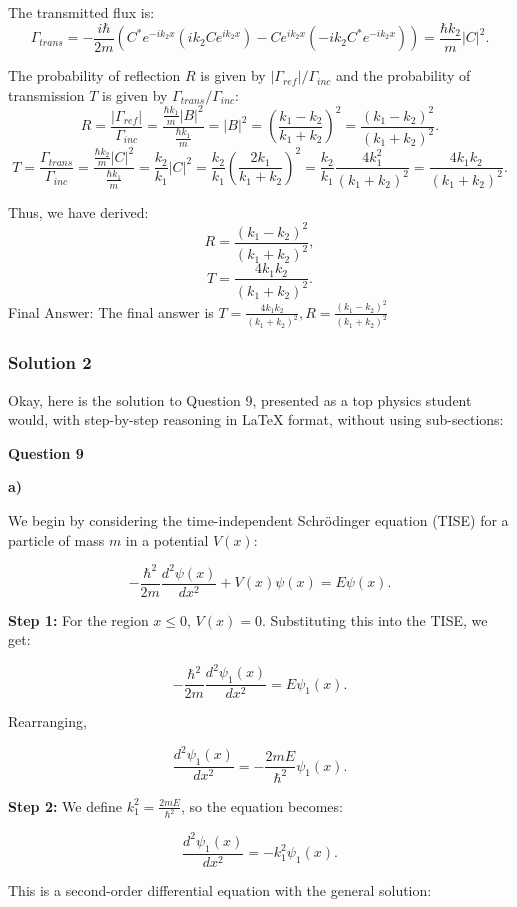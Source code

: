 \documentclass{article}
\begin{document}
The transmitted flux is:
\[
\Gamma_{trans} = -\frac{i\hbar}{2m} \left( C^*e^{-ik_2x}(ik_2Ce^{ik_2x}) - Ce^{ik_2x}(-ik_2C^*e^{-ik_2x}) \right) = \frac{\hbar k_2}{m} |C|^2.
\]

The probability of reflection $R$ is given by $|\Gamma_{ref}| / \Gamma_{inc}$ and the probability of transmission $T$ is given by $\Gamma_{trans} / \Gamma_{inc}$:
\[
R = \frac{|\Gamma_{ref}|}{\Gamma_{inc}} = \frac{\frac{\hbar k_1}{m} |B|^2}{\frac{\hbar k_1}{m}} = |B|^2 = \left( \frac{k_1 - k_2}{k_1 + k_2} \right)^2 = \frac{(k_1 - k_2)^2}{(k_1 + k_2)^2}.
\]
\[
T = \frac{\Gamma_{trans}}{\Gamma_{inc}} = \frac{\frac{\hbar k_2}{m} |C|^2}{\frac{\hbar k_1}{m}} = \frac{k_2}{k_1} |C|^2 = \frac{k_2}{k_1} \left( \frac{2k_1}{k_1 + k_2} \right)^2 = \frac{k_2}{k_1} \frac{4k_1^2}{(k_1 + k_2)^2} = \frac{4k_1k_2}{(k_1 + k_2)^2}.
\]

Thus, we have derived:
\[
R = \frac{(k_1 - k_2)^2}{(k_1 + k_2)^2},
\]
\[
T = \frac{4k_1k_2}{(k_1 + k_2)^2}.
\]
Final Answer: The final answer is $\boxed{T = \frac{4k_1k_2}{(k_1 + k_2)^2}, R = \frac{(k_1 - k_2)^2}{(k_1 + k_2)^2}}$

\subsubsection{Solution 2}
Okay, here is the solution to Question 9, presented as a top physics student would, with step-by-step reasoning in LaTeX format, without using sub-sections:

\textbf{Question 9}

\textbf{a)}

We begin by considering the time-independent Schrödinger equation (TISE) for a particle of mass $m$ in a potential $V(x)$:

\[ -\frac{\hbar^2}{2m} \frac{d^2 \psi(x)}{dx^2} + V(x)\psi(x) = E\psi(x). \]

\textbf{Step 1:}  For the region $x \leq 0$, $V(x) = 0$. Substituting this into the TISE, we get:

\[ -\frac{\hbar^2}{2m} \frac{d^2 \psi_1(x)}{dx^2} = E\psi_1(x). \]

Rearranging,

\[ \frac{d^2 \psi_1(x)}{dx^2} = -\frac{2mE}{\hbar^2}\psi_1(x). \]

\textbf{Step 2:} We define $k_1^2 = \frac{2mE}{\hbar^2}$, so the equation becomes:

\[ \frac{d^2 \psi_1(x)}{dx^2} = -k_1^2 \psi_1(x). \]

This is a second-order differential equation with the general solution:
\end{document}
